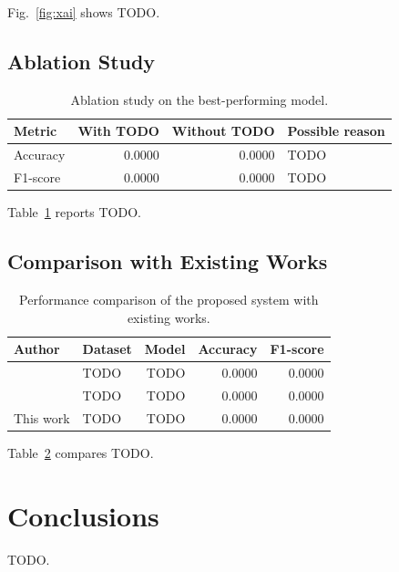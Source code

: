 \documentclass[journal,onecolumn]{IEEEtran}
\begin{document}
Fig.~\ref{fig:xai} shows TODO.

\subsection{Ablation Study}
\label{subsec:ablation}
\begin{table}[!t]
\centering
\caption{Ablation study on the best-performing model.}
\label{tab:ablation}
\begin{tabular}{lrrl}
\toprule
Metric & With TODO & Without TODO & Possible reason \\
\midrule
Accuracy & 0.0000 & 0.0000 & TODO \\
F1-score & 0.0000 & 0.0000 & TODO \\
\bottomrule
\end{tabular}
\end{table}

Table~\ref{tab:ablation} reports TODO.

\subsection{Comparison with Existing Works}
\label{subsec:comparison}
\begin{table}[!t]
\centering
\caption{Performance comparison of the proposed system with existing works.}
\label{tab:comparison}
\begin{tabular}{llrrr}
\toprule
Author & Dataset & Model & Accuracy & F1-score \\
\midrule
\cite{ref1} & TODO & TODO & 0.0000 & 0.0000 \\
\cite{ref2} & TODO & TODO & 0.0000 & 0.0000 \\
\midrule
This work & TODO & TODO & 0.0000 & 0.0000 \\
\bottomrule
\end{tabular}
\end{table}

Table~\ref{tab:comparison} compares TODO.

\section{Conclusions}
\label{sec:conclusion}
TODO.



\end{document}
